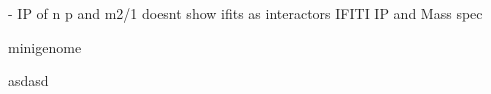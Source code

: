 \cite{Oliveira2013HumanCells} - IP of n p and m2/1 doesnt show ifits as interactors
IFITI IP and Mass spec

minigenome \cite{Teng2016UseTranscription}


asdasd





